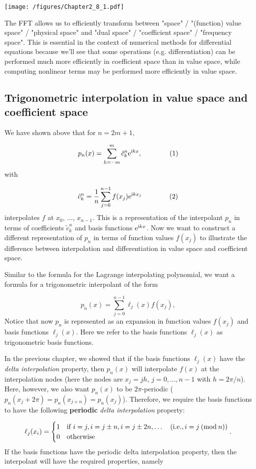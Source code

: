 \documentclass[12pt,landscape]{article}
\begin{document}
{\texttt{[image: /figures/Chapter2\_8\_1.pdf]}

The FFT allows us to efficiently transform between "space" / "(function) value space" / "physical space" and "dual space" / "coefficient space" / "frequency space".  This is essential in the context of numerical methods for differential equations because we'll see that some operations (e.g. differentiation) can be performed much more efficiently in coefficient space than in value space, while computing nonlinear terms may be performed more efficiently in value space.   

\subsection{Trigonometric interpolation in value space and coefficient space}
We have shown above that for $n = 2m+1$,

\[
p_n(x) = \sum_{k=-m}^{m} \tilde{c}^n_k{\rm e}^{{\rm i}kx},  \qquad \qquad (1)
\]
with

\[
\tilde{c}^n_k = \frac{1}{n}\sum_{j=0}^{n-1}f(x_j){\rm e}^{{\rm i}kx_j}  \qquad  \qquad (2)
\]
interpolates $f$ at $x_0$, $\ldots$, $x_{n-1}$. This is a representation of the interpolant $p_n$ in terms of coefficients $\tilde{c}^n_k$ and basis functions ${\rm e}^{{\rm i}kx}$.   Now we want to construct a different representation of $p_n$ in terms of function values $f(x_j)$ to illustrate the difference between interpolation and differentiation in value space and coefficient space. 

Similar to the formula for the Lagrange interpolating polynomial, we want a formula for a trigonometric interpolant of the form

\[
p_n(x) = \sum_{j=0}^{n-1}\ell_{j}(x) f(x_{j}),
\]
Notice that now $p_n$ is represented as an expansion in function values $f(x_{j})$ and basis functions $\ell_{j}(x)$.  Here we refer to the basis functions $\ell_{j}(x)$ as trigonometric basis functions.

In the previous chapter, we showed that if the basis functions $\ell_{j}(x)$ have the \emph{delta interpolation} property, then $p_n(x)$ will interpolate $f(x)$ at the interpolation nodes (here the nodes are $x_j = jh$, $j = 0, \ldots, n-1$ with $h = 2\pi/n$).  Here, however, we also want $p_n(x)$ to be $2\pi$-periodic ($p_n(x_j+2\pi) = p_n(x_{j+n}) = p_n(x_j)$).  Therefore, we  require the basis functions to have the following \textbf{periodic} \emph{delta interpolation} property:

\[
\ell_{j}(x_i) = \begin{cases}
1 & \text{if } i = j, i = j \pm n, i = j \pm 2n, \ldots \quad (\text{i.e.}, i = j\: ({\rm mod}\: n))  \\
0 & \text{otherwise } 
\end{cases}.
\]
If the basis functions have the periodic delta interpolation property, then the interpolant will have the required properties, namely

}
\end{document}
